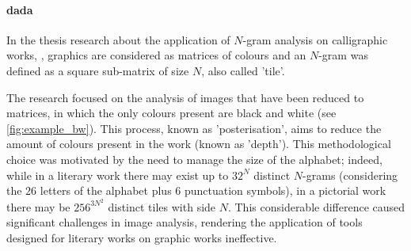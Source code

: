 \begin{toReview}
\paragraph{\gls{dada}}
In the thesis research about the application of $N$-gram analysis on calligraphic works, \citep[see][]{thesis}, graphics are considered as matrices of colours and an $N$-gram was defined as a square sub-matrix of size $N$, also called 'tile'.

\noindent The research focused on the analysis of images that have been reduced to matrices, in which the only colours present are black and white (see \cref{fig:example_bw}). This process, known as 'posterisation', aims to reduce the amount of colours present in the work (known as 'depth'). This methodological choice was motivated by the need to manage the size of the alphabet; indeed, while in a literary work there may exist up to $32^N$ distinct $N$-grams (considering the $26$ letters of the alphabet plus $6$ punctuation symbols), in a pictorial work there may be $256^{3N^2}$ distinct tiles with side $N$. This considerable difference caused significant challenges in image analysis, rendering the application of tools designed for literary works on graphic works ineffective.


\end{toReview}
